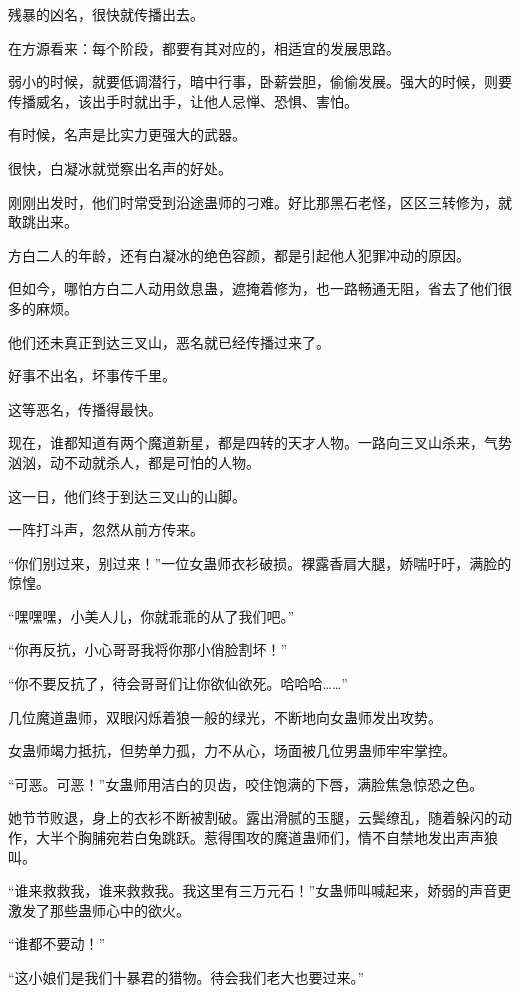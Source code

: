 \begin{this_body}
残暴的凶名，很快就传播出去。

在方源看来：每个阶段，都要有其对应的，相适宜的发展思路。

弱小的时候，就要低调潜行，暗中行事，卧薪尝胆，偷偷发展。强大的时候，则要传播威名，该出手时就出手，让他人忌惮、恐惧、害怕。

有时候，名声是比实力更强大的武器。

很快，白凝冰就觉察出名声的好处。

刚刚出发时，他们时常受到沿途蛊师的刁难。好比那黑石老怪，区区三转修为，就敢跳出来。

方白二人的年龄，还有白凝冰的绝色容颜，都是引起他人犯罪冲动的原因。

但如今，哪怕方白二人动用敛息蛊，遮掩着修为，也一路畅通无阻，省去了他们很多的麻烦。

他们还未真正到达三叉山，恶名就已经传播过来了。

好事不出名，坏事传千里。

这等恶名，传播得最快。

现在，谁都知道有两个魔道新星，都是四转的天才人物。一路向三叉山杀来，气势汹汹，动不动就杀人，都是可怕的人物。

这一日，他们终于到达三叉山的山脚。

一阵打斗声，忽然从前方传来。

“你们别过来，别过来！”一位女蛊师衣衫破损。裸露香肩大腿，娇喘吁吁，满脸的惊惶。

“嘿嘿嘿，小美人儿，你就乖乖的从了我们吧。”

“你再反抗，小心哥哥我将你那小俏脸割坏！”

“你不要反抗了，待会哥哥们让你欲仙欲死。哈哈哈……”

几位魔道蛊师，双眼闪烁着狼一般的绿光，不断地向女蛊师发出攻势。

女蛊师竭力抵抗，但势单力孤，力不从心，场面被几位男蛊师牢牢掌控。

“可恶。可恶！”女蛊师用洁白的贝齿，咬住饱满的下唇，满脸焦急惊恐之色。

她节节败退，身上的衣衫不断被割破。露出滑腻的玉腿，云鬓缭乱，随着躲闪的动作，大半个胸脯宛若白兔跳跃。惹得围攻的魔道蛊师们，情不自禁地发出声声狼叫。

“谁来救救我，谁来救救我。我这里有三万元石！”女蛊师叫喊起来，娇弱的声音更激发了那些蛊师心中的欲火。

“谁都不要动！”

“这小娘们是我们十暴君的猎物。待会我们老大也要过来。”


\end{this_body}
